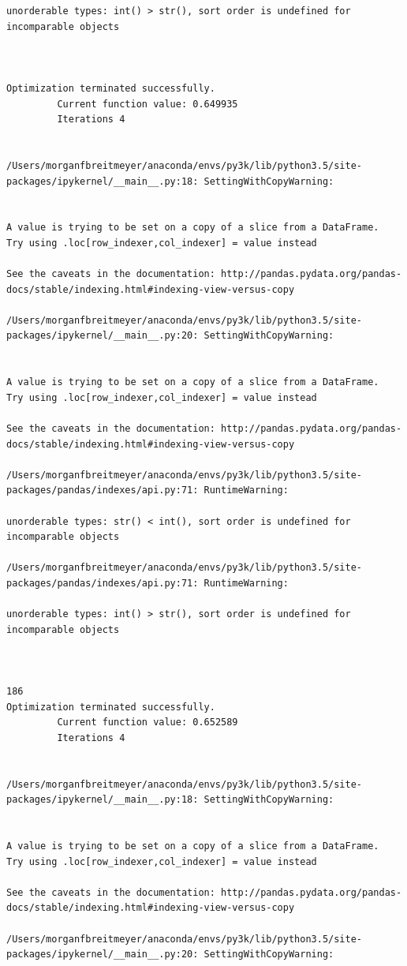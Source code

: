 \begin{lstlisting}
unorderable types: int() > str(), sort order is undefined for incomparable objects



Optimization terminated successfully.
         Current function value: 0.649935
         Iterations 4


/Users/morganfbreitmeyer/anaconda/envs/py3k/lib/python3.5/site-packages/ipykernel/__main__.py:18: SettingWithCopyWarning:


A value is trying to be set on a copy of a slice from a DataFrame.
Try using .loc[row_indexer,col_indexer] = value instead

See the caveats in the documentation: http://pandas.pydata.org/pandas-docs/stable/indexing.html#indexing-view-versus-copy

/Users/morganfbreitmeyer/anaconda/envs/py3k/lib/python3.5/site-packages/ipykernel/__main__.py:20: SettingWithCopyWarning:


A value is trying to be set on a copy of a slice from a DataFrame.
Try using .loc[row_indexer,col_indexer] = value instead

See the caveats in the documentation: http://pandas.pydata.org/pandas-docs/stable/indexing.html#indexing-view-versus-copy

/Users/morganfbreitmeyer/anaconda/envs/py3k/lib/python3.5/site-packages/pandas/indexes/api.py:71: RuntimeWarning:

unorderable types: str() < int(), sort order is undefined for incomparable objects

/Users/morganfbreitmeyer/anaconda/envs/py3k/lib/python3.5/site-packages/pandas/indexes/api.py:71: RuntimeWarning:

unorderable types: int() > str(), sort order is undefined for incomparable objects



186
Optimization terminated successfully.
         Current function value: 0.652589
         Iterations 4


/Users/morganfbreitmeyer/anaconda/envs/py3k/lib/python3.5/site-packages/ipykernel/__main__.py:18: SettingWithCopyWarning:


A value is trying to be set on a copy of a slice from a DataFrame.
Try using .loc[row_indexer,col_indexer] = value instead

See the caveats in the documentation: http://pandas.pydata.org/pandas-docs/stable/indexing.html#indexing-view-versus-copy

/Users/morganfbreitmeyer/anaconda/envs/py3k/lib/python3.5/site-packages/ipykernel/__main__.py:20: SettingWithCopyWarning:



\end{lstlisting}
